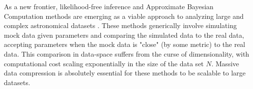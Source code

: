 \documentclass[fleqn,usenatbib]{mnras}
\begin{document}
As a new frontier, likelihood-free inference and Approximate Bayesian Computation methods are emerging as a viable approach to analyzing large and complex astronomical datasets \citep{Schafer2012, Cameron2012, Weyant2013, Robin2014, Lin2015, Akeret2015, Ishida2015, Jennings2016, Hahn2017, Kacprzak2017, Carassou2017, Davies2017, Alsing2018a}. These methods generically involve simulating mock data given parameters and comparing the simulated data to the real data, accepting parameters when the mock data is "close" (by some metric) to the real data. This comparison in data-space suffers from the curse of dimensionality, with computational cost scaling exponentially in the size of the data set $N$. Massive data compression is absolutely essential for these methods to be scalable to large datasets.

\end{document}
